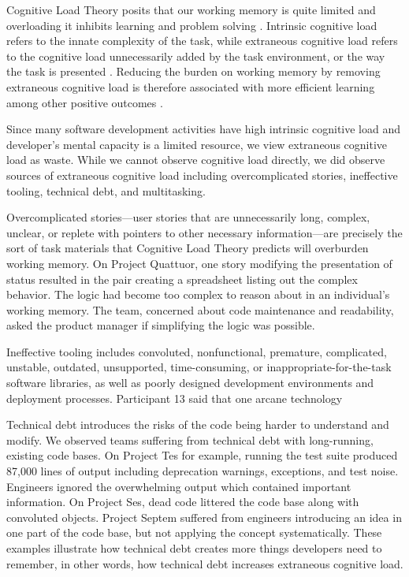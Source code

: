 Cognitive Load Theory \cite{Sweller1988} posits that our working memory is quite limited and overloading it inhibits learning and problem solving \cite{Artino2008}. Intrinsic cognitive load refers to the innate complexity of the task, while extraneous cognitive load refers to the cognitive load unnecessarily added by the task environment, or the way the task is presented \cite{Sweller2010}. Reducing the burden on working memory by removing extraneous cognitive load is therefore associated with more efficient learning among other positive outcomes \cite{VanSweller2005}.

Since many software development activities have high intrinsic cognitive load and developer's mental capacity is a limited resource, we view extraneous cognitive load as waste. While we cannot observe cognitive load directly, we did observe sources of extraneous cognitive load including overcomplicated stories, ineffective tooling, technical debt, and multitasking.

Overcomplicated stories---user stories that are unnecessarily long, complex, unclear, or replete with pointers to other necessary information---are precisely the sort of task materials that Cognitive Load Theory predicts will overburden working memory.  On Project Quattuor, one story modifying the presentation of status resulted in the pair creating a spreadsheet listing out the complex behavior. The logic had become too complex to reason about in an individual's working memory. The team, concerned about code maintenance and readability, asked the product manager if simplifying the logic was possible.

Ineffective tooling includes convoluted, nonfunctional, premature, complicated, unstable, outdated, unsupported, time-consuming, or inappropriate-for-the-task software libraries, as well as poorly designed development environments and deployment processes. Participant 13 said that one arcane technology 

Technical debt introduces the risks of the  code being harder to understand and modify. We observed teams suffering from technical debt with long-running, existing code bases. On Project Tes for example, running the test suite produced 87,000 lines of output including deprecation warnings, exceptions, and test noise. Engineers ignored the overwhelming output which contained important information. On Project Ses, dead code littered the code base along with convoluted objects. Project Septem suffered from engineers introducing an idea in one part of the code base, but not applying the concept systematically. These examples illustrate how technical debt creates more things developers need to remember, in other words, how technical debt increases extraneous cognitive load. 

